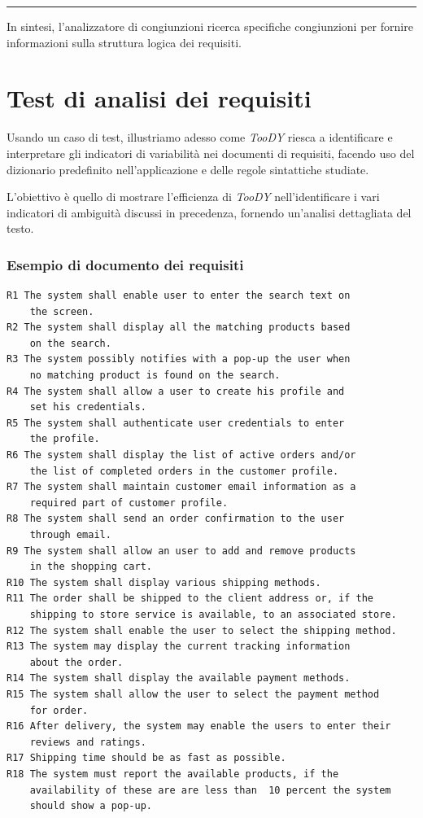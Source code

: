 \documentclass[12pt]{report}
\newcommand{\toody}{\textsl{TooDY}\xspace}
\begin{document}
{\centering \rule{0.5\linewidth}{0.1pt} \par\vspace{0.25cm}}

In sintesi, l'\textsf{analizzatore di congiunzioni} ricerca specifiche congiunzioni per fornire informazioni sulla struttura logica dei requisiti.


\section{Test di analisi dei requisiti}
Usando un caso di test, illustriamo adesso come \toody riesca a identificare e interpretare gli indicatori di variabilità nei documenti di requisiti, facendo uso del dizionario predefinito nell'applicazione e delle regole sintattiche studiate.

L'obiettivo è quello di mostrare l'efficienza di \toody nell'identificare i vari indicatori di ambiguità discussi in precedenza, fornendo un'analisi dettagliata del testo.


\newpage
\subsubsection{Esempio di documento dei requisiti}
\begin{lstlisting}
R1 The system shall enable user to enter the search text on
    the screen.
R2 The system shall display all the matching products based
    on the search.
R3 The system possibly notifies with a pop-up the user when
    no matching product is found on the search.
R4 The system shall allow a user to create his profile and
    set his credentials.
R5 The system shall authenticate user credentials to enter
    the profile.
R6 The system shall display the list of active orders and/or
    the list of completed orders in the customer profile.
R7 The system shall maintain customer email information as a
    required part of customer profile.
R8 The system shall send an order confirmation to the user
    through email.
R9 The system shall allow an user to add and remove products
    in the shopping cart.
R10 The system shall display various shipping methods.
R11 The order shall be shipped to the client address or, if the
    shipping to store service is available, to an associated store.
R12 The system shall enable the user to select the shipping method.
R13 The system may display the current tracking information
    about the order.
R14 The system shall display the available payment methods.
R15 The system shall allow the user to select the payment method
    for order.
R16 After delivery, the system may enable the users to enter their
    reviews and ratings.
R17 Shipping time should be as fast as possible.
R18 The system must report the available products, if the
    availability of these are are less than  10 percent the system
    should show a pop-up.
\end{lstlisting}
\end{document}
